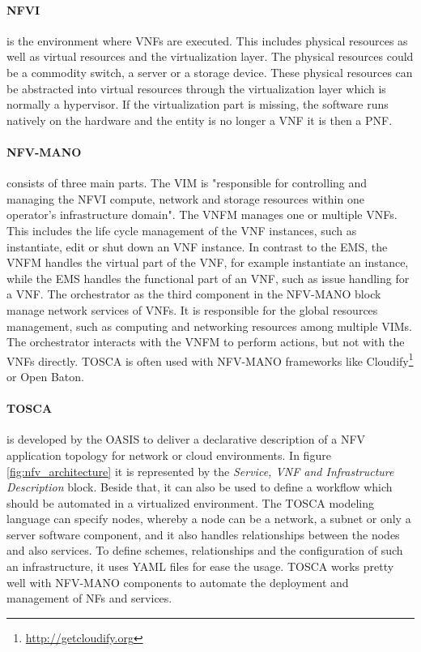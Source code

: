 \paragraph{\ac{NFVI}} is the environment where \acp{VNF} are executed.
This includes physical resources as well as virtual resources and the virtualization layer.
The physical resources could be a commodity switch, a server or a storage device.
These physical resources can be abstracted into virtual resources through the virtualization layer which is normally a hypervisor.
If the virtualization part is missing, the software runs natively on the hardware and the entity is no longer a \ac{VNF} it is then a \ac{PNF}.\autocite[cf.]{Kahn:2015}

\paragraph{\ac{NFV-MANO}} consists of three main parts.
The \ac{VIM} is "responsible for controlling and managing the NFVI compute, network and storage resources within one operator’s infrastructure domain"\autocite{Kahn:2015}.
The \ac{VNFM} manages one or multiple \acp{VNF}.
This includes the life cycle management of the \ac{VNF} instances, such as instantiate, edit or shut down an \ac{VNF} instance.\autocite[cf.]{Tosca:NFV}
In contrast to the \ac{EMS}, the \ac{VNFM} handles the virtual part of the \ac{VNF}, for example instantiate an instance, while the \ac{EMS} handles the functional part of an \ac{VNF}, such as issue handling for a \ac{VNF}.
The orchestrator as the third component in the \ac{NFV-MANO} block manage network services of \acp{VNF}.
It is responsible for the global resources management, such as computing and networking resources among multiple \acp{VIM}.\autocite[cf.]{Kahn:2015}
The orchestrator interacts with the \ac{VNFM} to perform actions, but not with the \acp{VNF} directly.\autocite[cf.]{Kahn:2015}
\ac{TOSCA} is often used with \ac{NFV-MANO} frameworks like Cloudify\footnote{\url{http://getcloudify.org}} or Open Baton.\autocite[cf.]{Tosca:NFV}

\paragraph{\ac{TOSCA}} is developed by the \ac{OASIS} to deliver a declarative description of a \ac{NFV} application topology for network or cloud environments.\autocite[cf.]{Tosca:NFV}
In figure \ref{fig:nfv_architecture} it is represented by the \textit{Service, VNF and Infrastructure Description} block.
Beside that, it can also be used to define a workflow which should be automated in a virtualized environment.\autocite[cf.]{Tosca:NFV}
The \ac{TOSCA} modeling language can specify nodes, whereby a node can be a network, a subnet or only a server software component, and it also handles relationships between the nodes and also services.\autocite[cf.]{Tosca:NFV}
To define schemes, relationships and the configuration of such an infrastructure, it uses \ac{YAML} files for ease the usage.\autocite[cf.]{Tosca:NFV}
\ac{TOSCA} works pretty well with \ac{NFV-MANO} components to automate the deployment and management of \acp{NF} and services.


